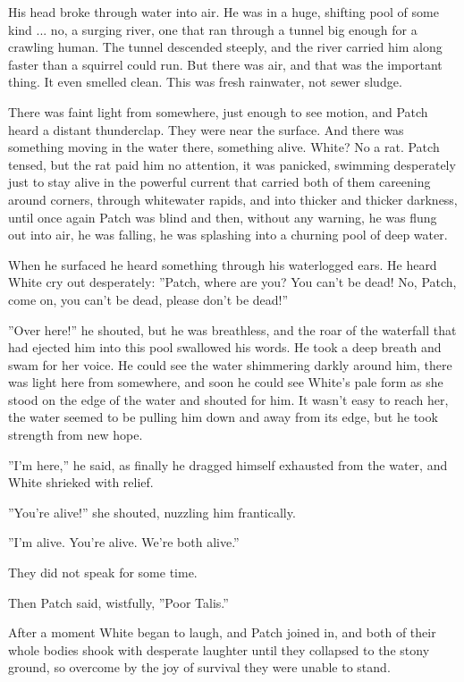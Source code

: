 \documentclass[12pt]{book}
\begin{document}
 His head broke through water into air. He was in a huge, shifting pool of some kind ... no, a surging river, one that ran through a tunnel big enough for a crawling human. The tunnel descended steeply, and the river carried him along faster than a squirrel could run. But there was air, and that was the important thing. It even smelled clean. This was fresh rainwater, not sewer sludge.\par
 There was faint light from somewhere, just enough to see motion, and Patch heard a distant thunderclap. They were near the surface. And there was something moving in the water there, something alive. White? No %
 a rat. Patch tensed, but the rat paid him no attention, it was panicked, swimming desperately just to stay alive in the powerful current that carried both of them careening around corners, through whitewater rapids, and into thicker and thicker darkness, until once again Patch was blind %
 and then, without any warning, he was flung out into air, he was falling, he was splashing into a churning pool of deep water.\par
 When he surfaced he heard something through his waterlogged ears. He heard White cry out desperately: ''Patch, where are you? You can't be dead! No, Patch, come on, you can't be dead, please don't be dead!''\par
 ''Over here!'' he shouted, but he was breathless, and the roar of the waterfall that had ejected him into this pool swallowed his words. He took a deep breath and swam for her voice. He could see the water shimmering darkly around him, there was light here from somewhere, and soon he could see White's pale form as she stood on the edge of the water and shouted for him. It wasn't easy to reach her, the water seemed to be pulling him down and away from its edge, but he took strength from new hope.\par
 ''I'm here,'' he said, as finally he dragged himself exhausted from the water, and White shrieked with relief.\par
 ''You're alive!'' she shouted, nuzzling him frantically.\par
 ''I'm alive. You're alive. We're both alive.''\par
 They did not speak for some time.\par
 Then Patch said, wistfully, ''Poor Talis.''\par
 After a moment White began to laugh, and Patch joined in, and both of their whole bodies shook with desperate laughter until they collapsed to the stony ground, so overcome by the joy of survival they were unable to stand.\par
\end{document}
